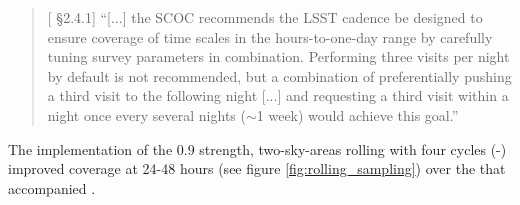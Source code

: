 \begin{quote}
    {[ \S2.4.1] ``[...] the SCOC recommends the LSST cadence be designed to ensure coverage of time scales in the hours-to-one-day range by carefully tuning survey parameters in combination. Performing three visits per night by default is not recommended, but a combination of preferentially pushing a third visit to the following night [...] and requesting a third visit within a night once every several nights (\mbox{$\sim$1} week) would achieve this goal.'' }
\end{quote}

The implementation of the 0.9 strength, two-sky-areas rolling with four cycles (-) improved coverage at 24-48 hours (see figure \autoref{fig:rolling_sampling}) over the  that accompanied .

